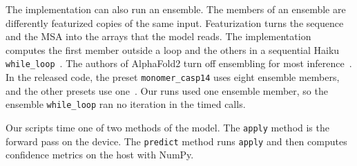 The implementation can also run an ensemble. The members of an ensemble are differently featurized copies of the same
input. Featurization turns the sequence and the MSA into the arrays that the model reads. The implementation computes the
first member outside a loop and the others in a sequential Haiku \texttt{while\_loop}~\cite{alphafoldrepo}. %
The authors of AlphaFold2 turn off ensembling for most inference~\cite{jumper2021alphafold}. In the released code, the
preset \texttt{monomer\_casp14} uses eight ensemble members, and the other presets use one~\cite{alphafoldrepo}. %
Our runs used one ensemble member, so the ensemble \texttt{while\_loop} ran no iteration in the timed calls. %

Our scripts time one of two methods of the model. The \texttt{apply} method is the forward pass on the device. The
\texttt{predict} method runs \texttt{apply} and then computes confidence metrics on the host with NumPy.
